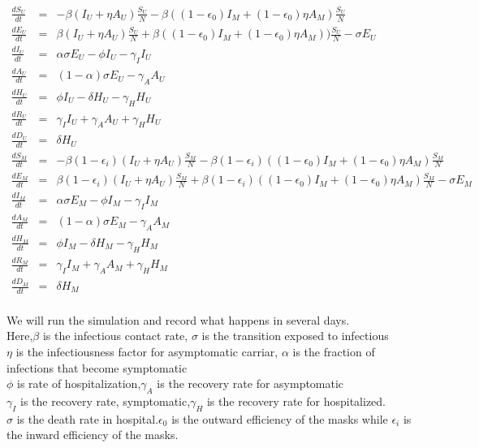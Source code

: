 \documentclass{article}
\begin{document}
\begin{minipage}{0.35\textwidth}
\tiny
\begin{eqnarray}
  \frac{dS_{U}}{dt} &=& -\beta(I_{U}+\eta A_{U})\frac{S_{U}}{N}-\beta((1-\epsilon_{0})I_{M}+(1-\epsilon_{0})\eta A_{M})\frac{S_{U}}{N}\nonumber\\
  \frac{dE_{U}}{dt} &=& \beta(I_{U}+\eta{A}_{U})\frac{S_{U}}{N}+\beta((1-\epsilon_{0})I_{M}+(1-\epsilon_{0})\eta A_{M}))\frac{S_{U}}{N}-\sigma E_{U}\nonumber\\
  \frac{dI_{U}}{dt} &=& \alpha\sigma E_{U}-\phi I_{U} - \gamma_{I}I_{U}\nonumber\\
  \frac{dA_{U}}{dt} &=& (1-\alpha)\sigma E_{U}-\gamma_{A}A_{U}\nonumber\\
  \frac{dH_{U}}{dt} &=& \phi I_{U}-\delta H_{U}-\gamma_{H}H_{U}\nonumber\\
  \frac{dR_{U}}{dt} &=& \gamma_{I}I_{U}+\gamma_{A}A_{U}+\gamma_{H}H_{U}\nonumber\\
  \frac{dD_{U}}{dt} &=& \delta H_{U}\nonumber\\
  \frac{dS_{M}}{dt} &=& -\beta (1-\epsilon_{i})(I_{U}+\eta A_{U})\frac{S_{M}}{N}-\beta(1-\epsilon_{i})((1-\epsilon_{0})I_{M}+(1-\epsilon_{0})\eta A_{M})\frac{S_{M}}{N}\nonumber\\
  \frac{dE_{M}}{dt} &=& \beta(1-\epsilon_{i})(I_{U}+\eta A_{U})\frac{S_{M}}{N}+\beta(1-\epsilon_{i})((1-\epsilon_{0})I_{M}+(1-\epsilon_{0})\eta A_{M})\frac{S_{M}}{N}-\sigma E_{M}\nonumber\\
  \frac{dI_{M}}{dt} &=& \alpha\sigma E_{M}-\phi I_{M}-\gamma_{I} I_{M}\nonumber\\
  \frac{dA_{M}}{dt} &=& (1-\alpha)\sigma E_{M}-\gamma_{A}A_{M}\nonumber\\
  \frac{dH_{M}}{dt} &=& \phi I_{M}-\delta H_{M}-\gamma_{H} H_{M}\nonumber\\
  \frac{dR_{M}}{dt} &=& \gamma_{I}I_{M}+\gamma_{A}A_{M}+\gamma_{H}H_{M}\nonumber\\
  \frac{dD_{M}}{dt} &=& \delta H_{M}\nonumber\\
  \end{eqnarray}
\end{minipage}

We will run the simulation and record what happens in several days. \\Here,$\beta$ is the infectious contact rate, $\sigma$ is the transition exposed to infectious\\$\eta$ is the infectiousness factor for asymptomatic carriar, $\alpha$ is the fraction of infections that become symptomatic\\
$\phi$ is rate of hospitalization,$\gamma_{A}$ is the recovery rate for asymptomatic
\\$\gamma_{I}$ is the recovery rate, symptomatic,$\gamma_{H}$ is the recovery rate for hospitalized.\\$\sigma$ is the death rate in hospital.$\epsilon_{0}$ is the outward efficiency of the masks while $\epsilon_{i}$ is the inward efficiency of the masks.\\
\end{document}
